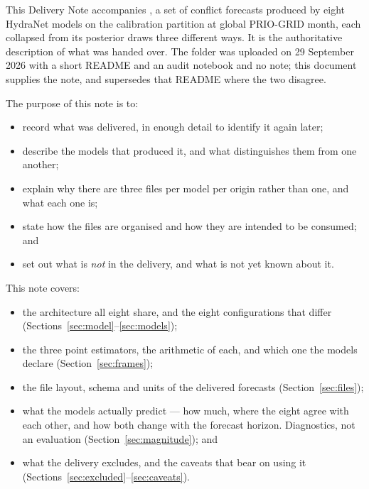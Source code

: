 This Delivery Note accompanies \texttt{\deliveryid}, a set of conflict forecasts produced by eight
HydraNet models on the calibration partition at global PRIO-GRID month, each collapsed from its
posterior draws three different ways. It is the authoritative description of what was handed over.
The folder was uploaded on 29 September 2026 with a short README and an audit notebook and no note;
this document supplies the note, and supersedes that README where the two disagree.

The purpose of this note is to:
\begin{itemize}
    \item record what was delivered, in enough detail to identify it again later;
    \item describe the models that produced it, and what distinguishes them from one another;
    \item explain why there are three files per model per origin rather than one, and what each
          one is;
    \item state how the files are organised and how they are intended to be consumed; and
    \item set out what is \emph{not} in the delivery, and what is not yet known about it.
\end{itemize}

\noindent This note covers:
\begin{itemize}
    \item the architecture all eight share, and the eight configurations that differ
          (Sections~\ref{sec:model}--\ref{sec:models});
    \item the three point estimators, the arithmetic of each, and which one the models declare
          (Section~\ref{sec:frames});
    \item the file layout, schema and units of the delivered forecasts
          (Section~\ref{sec:files});
    \item what the models actually predict --- how much, where the eight agree with each
          other, and how both change with the forecast horizon. Diagnostics, not an evaluation
          (Section~\ref{sec:magnitude}); and
    \item what the delivery excludes, and the caveats that bear on using it
          (Sections~\ref{sec:excluded}--\ref{sec:caveats}).
\end{itemize}

